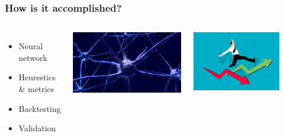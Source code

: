 
\begin{frame}
  \frametitle{How is it accomplished?}
  \begin{columns}
    \begin{itemize}
        \item Neural network
        \item Heurestics \& metrics
        \item Backtesting
        \item Validation
    \end{itemize}

        \centering
        \includegraphics[width=\textwidth]{img/neuron.jpg}

        \bigskip
        \includegraphics[width=0.8\textwidth]{img/risk.png}
  \end{columns}
\end{frame}


